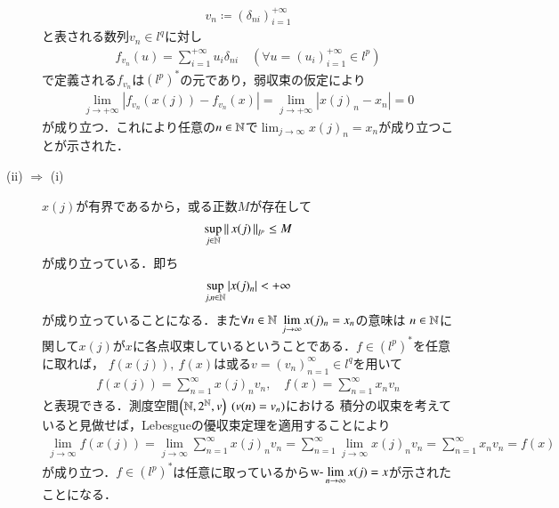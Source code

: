 \begin{prf}
\begin{description}
\begin{align}
			v_n \coloneqq (\delta_{ni})_{i=1}^{+\infty}
		\end{align}
		と表される数列$v_n \in l^q$に対し
		\begin{align}
			f_{v_n} (u) = \sum_{i = 1}^{+\infty} u_i \delta_{ni} \quad \left(\forall u = (u_i)_{i=1}^{+\infty} \in l^p\right)
		\end{align}
		で定義される$f_{v_n}$は$\left(l^p\right)^*$の元であり，弱収束の仮定により
		\begin{align}
			\lim_{j \to +\infty}\left|f_{v_n}(x(j)) - f_{v_n}(x)\right| = \lim_{j \to +\infty}|x(j)_n - x_n| = 0
		\end{align}
		が成り立つ．これにより任意の$n \in \mathbb{N}$で$\displaystyle \lim_{j \to \infty}x(j)_n = x_n$が成り立つことが示された．
	\item[\rm{(ii)} $\Rightarrow$ \rm{(i)}] $x(j)$が有界であるから，或る正数$M$が存在して
		\begin{align}
			\operatorname*{sup}_{j \in \mathbb{N}} \left\|\, x(j)\, \right\|_{l^p} \leq M
		\end{align}
		が成り立っている．即ち
		\begin{align}
			\operatorname*{sup}_{j,n \in \mathbb{N}} \left|x(j)_n\right| < +\infty
		\end{align}
		が成り立っていることになる．また$\forall n \in \mathbb{N}\ \displaystyle \lim_{j \to \infty}x(j)_n = x_n$の意味は
		$n \in \mathbb{N}$に関して$x(j)$が$x$に各点収束しているということである．$f \in \left(l^p\right)^*$を任意に取れば，
		$f(x(j)),\ f(x)$は或る$v=(v_n)_{n=1}^{\infty} \in l^q$を用いて
		\begin{align}
			f(x(j)) = \sum_{n=1}^{\infty} x(j)_n v_n,\quad f(x) = \sum_{n=1}^{\infty} x_n v_n
		\end{align}
		と表現できる．測度空間$\left(\mathbb{N}, 2^{\mathbb{N}}, v\right)\ (v(n) = v_n)$における
		積分の収束を考えていると見做せば，Lebesgueの優収束定理を適用することにより
		\begin{align}
			\lim_{j \to \infty} f(x(j)) = \lim_{j \to \infty} \sum_{n=1}^{\infty} x(j)_n v_n 
			= \sum_{n=1}^{\infty} \lim_{j \to \infty} x(j)_n v_n = \sum_{n=1}^{\infty} x_n v_n = f(x)
		\end{align}
		が成り立つ．$f \in \left(l^p\right)^*$は任意に取っているから$\displaystyle \mbox{w-}\lim_{n \to \infty} x(j) = x$が示されたことになる．
		\QED
\end{description}
\end{prf}
